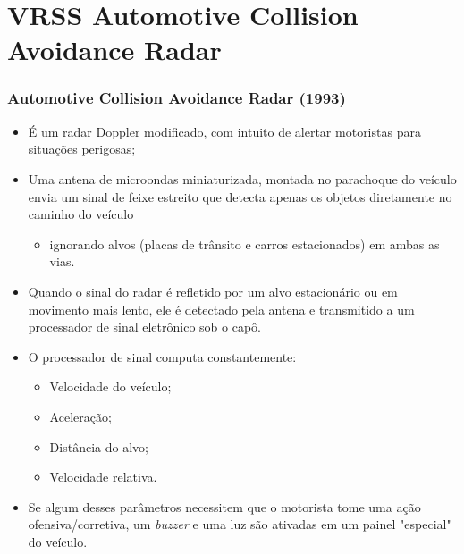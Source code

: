 \documentclass[xcolor=dvipsnames, aspectratio=169]{beamer}
\begin{document}
\section[VRSS Automotive Collision Avoidance Radar]{VRSS Automotive Collision Avoidance Radar} 

\begin{frame}
\frametitle{Automotive Collision Avoidance Radar (1993)}
	\begin{itemize}
		\item É um radar Doppler modificado, com intuito de alertar motoristas para situações perigosas;
		\item Uma antena de microondas miniaturizada, montada no parachoque do veículo envia um sinal de feixe estreito que detecta apenas os objetos diretamente no caminho do veículo
        \begin{itemize}
            \item ignorando alvos (placas de trânsito e carros estacionados) em ambas as vias.
        \end{itemize}
        \item Quando o sinal do radar é refletido por um alvo estacionário ou em movimento mais lento, ele é detectado pela antena e transmitido a um processador de sinal eletrônico sob o capô.
        \item O processador de sinal computa constantemente:
        \begin{itemize}
            \item Velocidade do veículo;
            \item Aceleração;
            \item Distância do alvo;
            \item Velocidade relativa.
        \end{itemize}
        \item Se algum desses parâmetros necessitem que o motorista tome uma ação ofensiva/corretiva, um \textit{buzzer} e uma luz são ativadas em um painel "especial" do veículo.
        \begin{figure}
            \centering

\end{figure}
\end{itemize}
\end{frame}
\end{document}
